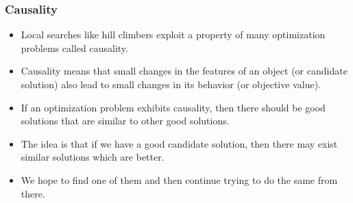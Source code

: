 \documentclass[mathserif]{beamer}%
\begin{document}
%
\begin{frame}%
\frametitle{Causality}%
\begin{itemize}%
\item Local searches like hill climbers exploit a property of many optimization problems called \alert{causality}\cite{R1973ES,R1994ES,WCT2012EOPABT,WZCN2009WIOD}.%
\item<2-> Causality means that small changes in the features of an object (or candidate solution) also lead to small changes in its behavior (or objective value).%
\item<3-> If an optimization problem exhibits causality, then there should be good solutions that are similar to other good solutions.%
\item<4-> The idea is that if we have a good candidate solution, then there may exist similar solutions which are better.%
\item<5-> We hope to find one of them and then continue trying to do the same from there.%
\end{itemize}%
\end{frame}%
%
\end{document}

